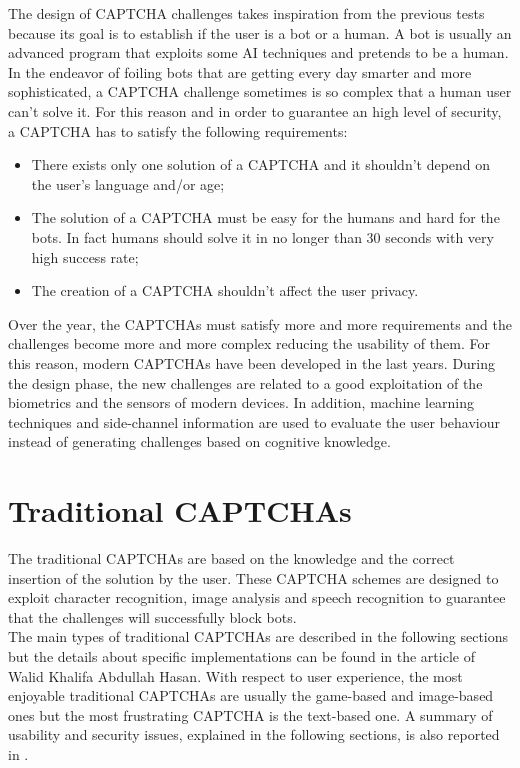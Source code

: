 The design of CAPTCHA challenges takes inspiration from the previous tests because its goal is to establish if the user is a bot or a human. A bot is usually an advanced program that exploits some AI techniques and pretends to be a human. In the endeavor of foiling bots that are getting every day smarter and more sophisticated, a CAPTCHA challenge sometimes is so complex that a human user can't solve it. For this reason and in order to guarantee an high level of security, a CAPTCHA has to satisfy the following requirements:
\begin{itemize}
	\item{There exists only one solution of a CAPTCHA and it shouldn't depend on the user's language and/or age;}
	\item{The solution of a CAPTCHA must be easy for the humans and hard for the bots. In fact humans should solve it in no longer than 30 seconds with very high success rate;}
	\item{The creation of a CAPTCHA shouldn't affect the user privacy.}
\end{itemize}
Over the year, the CAPTCHAs must satisfy more and more requirements and the challenges become more and more complex reducing the usability of them. For this reason, modern CAPTCHAs have been developed in the last years. During the design phase, the new challenges are related to a good exploitation of the biometrics and the sensors of modern devices. In addition, machine learning techniques and side-channel information are used to evaluate the user behaviour instead of generating challenges based on cognitive knowledge. 

\section{Traditional CAPTCHAs}
The traditional CAPTCHAs are based on the knowledge and the correct insertion of the solution by the user. These CAPTCHA schemes are designed to exploit character recognition, image analysis and speech recognition to guarantee that the challenges will successfully block bots.\\
The main types of traditional CAPTCHAs are described in the following sections but the details about specific implementations can be found in the article of Walid Khalifa Abdullah Hasan\cite{survey_advanced_CAPTCHA}. With respect to user experience, the most enjoyable traditional CAPTCHAs are usually the game-based and image-based ones but the most frustrating CAPTCHA is the text-based one\cite{usability_CAPTCHA}. A summary of usability and security issues, explained in the following sections, is also reported in .

